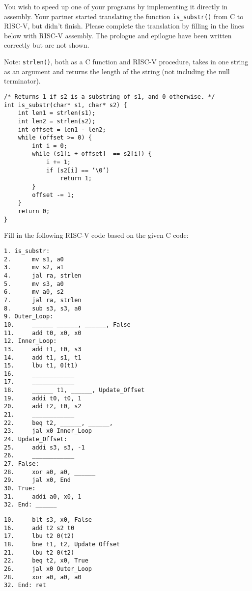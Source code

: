 \begin{blocksection}
\question
You wish to speed up one of your programs by implementing it directly in assembly. Your partner started translating the function \lstinline$is_substr()$ from C to RISC-V, but didn’t finish. Please complete the translation by filling in the lines below with RISC-V assembly. The prologue and epilogue have been written correctly but are not shown.

Note: \lstinline$strlen()$, both as a C function and RISC-V procedure, takes in one string as an argument and returns the length of the string (not including the null terminator).

\begin{verbatim}
/* Returns 1 if s2 is a substring of s1, and 0 otherwise. */
int is_substr(char* s1, char* s2) {
    int len1 = strlen(s1);
    int len2 = strlen(s2);
    int offset = len1 - len2;
    while (offset >= 0) {
        int i = 0;
        while (s1[i + offset]  == s2[i]) {
            i += 1;
            if (s2[i] == ‘\0’) 
                return 1;
        }
        offset -= 1;
    }
    return 0;
}
\end{verbatim}
\end{blocksection}

\begin{blocksection}
Fill in the following RISC-V code based on the given C code:

\begin{verbatim}
1. is_substr:
2.      mv s1, a0
3.      mv s2, a1
4.      jal ra, strlen
5.      mv s3, a0
6.      mv a0, s2
7.      jal ra, strlen
8.      sub s3, s3, a0
9. Outer_Loop:
10.     ______ ______, ______, False
11.     add t0, x0, x0
12. Inner_Loop:
13.     add t1, t0, s3
14.     add t1, s1, t1
15.     lbu t1, 0(t1)
16.     ____________
17.     ____________
18.     ______ t1, ______, Update_Offset
19.     addi t0, t0, 1
20.     add t2, t0, s2
21.     ____________
22.     beq t2, ______, ______,
23.     jal x0 Inner_Loop
24. Update_Offset: 
25.     addi s3, s3, -1
26.     ____________
27. False: 
28.     xor a0, a0, ______
29.     jal x0, End
30. True: 
31.     addi a0, x0, 1
32. End: ______
\end{verbatim}

\begin{solution}
\begin{verbatim}
10.     blt s3, x0, False
16.     add t2 s2 t0
17.     lbu t2 0(t2)
18.     bne t1, t2, Update Offset
21.     lbu t2 0(t2)
22.     beq t2, x0, True
26.     jal x0 Outer_Loop
28.     xor a0, a0, a0
32. End: ret
\end{verbatim}
\end{solution}



\end{blocksection}